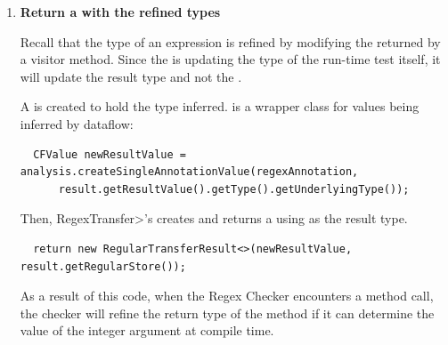 \begin{enumerate}
\begin{smaller}
\begin{Verbatim}
  AnnotationMirror regexAnnotation;
  Node count = n.getArgument(1);
  if (count instanceof IntegerLiteralNode) {
    // argument is a literal integer
    IntegerLiteralNode iln = (IntegerLiteralNode) count;
    Integer groupCount = iln.getValue();
    regexAnnotation = factory.createRegexAnnotation(groupCount);
  } else {
    // argument is not a literal integer; fall back to @Regex(), which is the same as @Regex(0)
    regexAnnotation = AnnotationBuilder.fromClass(factory.getElementUtils(), Regex.class);
  }
\end{Verbatim}
\end{smaller}


\item \textbf{Return a  with the
    refined types}

Recall that the type of an expression is refined by modifying the
 returned by a visitor method.
Since the  is updating the type of
the run-time test itself, it will update the result type and not the
.

A  is created to hold the type inferred.
 is a wrapper class for values being inferred
by dataflow:
\begin{smaller}
\begin{Verbatim}
  CFValue newResultValue = analysis.createSingleAnnotationValue(regexAnnotation,
      result.getResultValue().getType().getUnderlyingType());
\end{Verbatim}
\end{smaller}

Then, \<RegexTransfer>'s  creates and returns a
 using  as the
result type.

\begin{smaller}
\begin{Verbatim}
  return new RegularTransferResult<>(newResultValue, result.getRegularStore());
\end{Verbatim}
\end{smaller}

As a result of this code, when the Regex Checker encounters a
 method call, the checker will refine the return
type of the method if it can determine the value of the integer argument
at compile time.

\end{enumerate}



